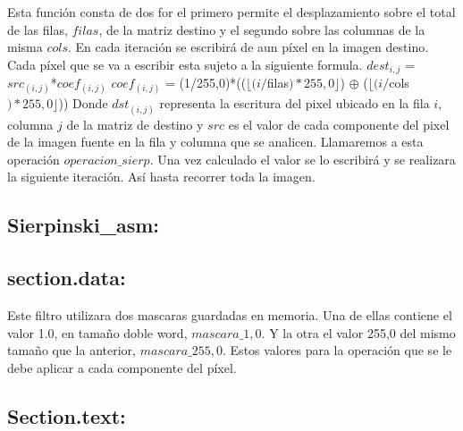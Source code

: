 \documentclass[a4paper]{article}
\begin{document}
Esta función consta de dos for el primero permite el desplazamiento sobre el total de las filas, $filas$, de la matriz destino y el segundo sobre las columnas de la misma $cols$. En cada iteración se escribirá de aun píxel en la imagen destino. Cada píxel que se va a escribir esta sujeto a la siguiente formula.
$dest_{i,j}$ = $src_{(i,j)}$*$coef_{(i,j)}$ \newline
$coef_{(i,j)}$ = (1/255,0)*(($\lfloor(i/$filas$)*255,0\rfloor$) $\oplus$ 
 ($\lfloor(i/$cols$)*255,0\rfloor$))\newline
Donde $ dst_{(i,j)}$ representa la escritura del pixel ubicado en la fila $i$, columna $j$ de la matriz de destino y $src$ es el valor de cada componente del pixel de la imagen fuente en la fila y columna que se analicen. \newline Llamaremos a esta operación $operacion\_sierp$. \newline 
Una vez calculado el valor se lo escribirá  y se realizara la siguiente iteración. Así hasta recorrer toda la imagen. 



\subsection{Sierpinski\_asm:}

\subsection*{section.data:}


Este filtro utilizara dos mascaras guardadas en memoria. Una de ellas contiene el valor 1.0, en tamaño doble word, $mascara\_1,0$. Y la otra el valor 255,0 del mismo tamaño que la anterior, $mascara\_255,0$. Estos valores para la operación que se le debe aplicar a cada componente del píxel.

\subsection*{Section.text:}
\end{document}
